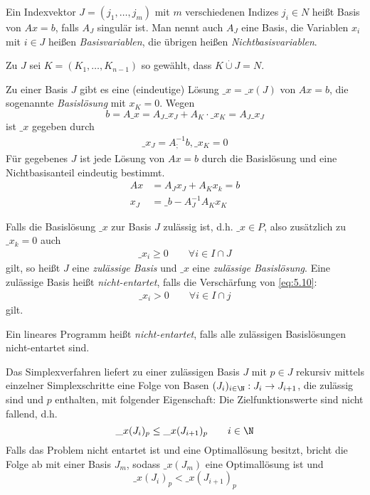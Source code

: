 \documentclass{mycourse}
\begin{document}
\begin{df}
	\label{df:5.8}
	Ein Indexvektor $J=(j_1,\dotsc,j_m)$ mit $m$ verschiedenen Indizes $j_i\in N$ heißt Basis von $Ax=b$, 
	falls $A_J$ singulär ist.
	Man nennt auch $A_J$ eine Basis, die Variablen $x_i$ mit $i\in J$ heißen \emph{Basisvariablen}, die übrigen heißen \emph{Nichtbasisvariablen}.

Zu $J$ sei $K=(K_1,\dotsc, K_{n-1})$ so gewählt, dass $K\stackrel \cdot \cup J = N$.

Zu einer Basis $J$ gibt es eine (eindeutige) Lösung $\_x=\_x(J)$ von $Ax=b$, die sogenannte \emph{Basislösung} mit $x_K=0$.
Wegen 
\[
	b = A\_x = A_J \_x_J + A_K \cdot \_x_K = A_J\_x_J
\]
ist $\_x$ gegeben durch
\begin{align}
	\label{eq:5.8}
	\_x_J = A_;^{-1}b, \_x_K = 0
\end{align}
Für gegebenes $J$ ist jede Lösung von $Ax=b$ durch die Basislösung und eine Nichtbasisanteil eindeutig bestimmt.
\begin{align}
	Ax &=A_J x_J + A_K x_k = b\\
	x_J &= \_b - A_J^{-1}A_Kx_K \tag{5.9}\label{eq:5.9}
\end{align}
\setcounter{equation}{9}

Falls die Basislösung $\_x$ zur Basis $J$ zulässig ist, d.h. $\_x\in P$, also zusätzlich zu $\_x_k=0$ auch
\begin{align}
	\label{eq:5.10}
	\_x_i \ge 0 \qquad \forall i\in I\cap J
\end{align}
gilt, so heißt $J$ eine \emph{zulässige Basis} und $\_x$ eine \emph{zulässige Basislösung}.
Eine zulässige Basis heißt \emph{nicht-entartet}, falls die Verschärfung von \ref{eq:5.10}:
\begin{align}
	\label{eq:5.11}
	\_x_i > 0 \qquad \forall i\in I\cap j
\end{align}
gilt.

Ein lineares Programm heißt \emph{nicht-entartet}, falls alle zulässigen Basislösungen nicht-entartet sind.
\end{df}

Das Simplexverfahren liefert zu einer zulässigen Basis $J$ mit $p\in J$ rekursiv mittels einzelner Simplexschritte eine Folge von Basen $(J_i)_{i\in\N} : J_i \to J_{i+1}$, die zulässig sind und $p$ enthalten, mit folgender Eigenschaft:
Die Zielfunktionswerte sind nicht fallend, d.h.
\[
	\_x(J_i)_p \le \_x(J_{i+1})_p \qquad i\in \N
\]
Falls das Problem nicht entartet ist und eine Optimallösung besitzt, bricht die Folge ab mit einer Basis $J_m$, sodass $\_x(J_m)$ eine Optimallösung ist und
\[
	\_x(J_i)_p < \_x(J_{i+1})_p
\]
\end{document}
